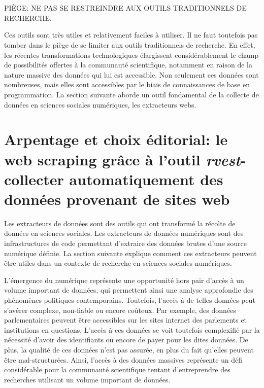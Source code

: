 \documentclass[
  letterpaper,
  DIV=11,
  numbers=noendperiod]{scrreprt}
\begin{document}
\hypertarget{section}{%
\section{}\label{section}}

PIÈGE: NE PAS SE RESTREINDRE AUX OUTILS TRADITIONNELS DE RECHERCHE.

Ces outils sont très utiles et relativement faciles à utiliser. Il ne
faut toutefois pas tomber dans le piège de se limiter aux outils
traditionnels de recherche. En effet, les récentes transformations
technologiques élargissent considérablement le champ de possibilités
offertes à la communauté scientifique, notamment en raison de la nature
massive des données qui lui est accessible. Non seulement ces données
sont nombreuses, mais elles sont accessibles par le biais de
connaissances de base en programmation. La section suivante aborde un
outil fondamental de la collecte de données en sciences sociales
numériques, les extracteurs webs.

\hypertarget{arpentage-et-choix-uxe9ditorial-le-web-scraping-gruxe2ce-uxe0-loutil-rvest--collecter-automatiquement-des-donnuxe9es-provenant-de-sites-web}{%
\section{\texorpdfstring{\textbf{Arpentage et choix éditorial: le web
scraping grâce à l'outil \emph{rvest}- collecter automatiquement des
données provenant de sites
web}}{Arpentage et choix éditorial: le web scraping grâce à l'outil rvest- collecter automatiquement des données provenant de sites web}}\label{arpentage-et-choix-uxe9ditorial-le-web-scraping-gruxe2ce-uxe0-loutil-rvest--collecter-automatiquement-des-donnuxe9es-provenant-de-sites-web}}

Les extracteurs de données sont des outils qui ont transformé la récolte
de données en sciences sociales. Les extracteurs de données numériques
sont des infrastructures de code permettant d'extraire des données
brutes d'une source numérique définie. La section suivante explique
comment ces extracteurs peuvent être utiles dans un contexte de
recherche en sciences sociales numériques.

L'émergence du numérique représente une opportunité hors pair d'accès à
un volume important de données, qui permettent ainsi une analyse
approfondie des phénomènes politiques contemporains. Toutefois, l'accès
à de telles données peut s'avérer complexe, non-fiable ou encore
coûteux. Par exemple, des données parlementaires peuvent être
accessibles sur les sites internet des parlements et institutions en
questions. L'accès à ces données se voit toutefois complexifié par la
nécessité d'avoir des identifiants ou encore de payer pour les dites
données. De plus, la qualité de ces données n'est pas assurée, en plus
du fait qu'elles peuvent être mal-structurées. Ainsi, l'accès à des
données massives représente un défi considérable pour la communauté
scientifique tentant d'entreprendre des recherches utilisant un volume
important de données.
\end{document}
